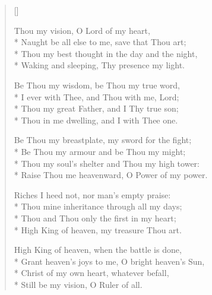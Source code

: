 \newHymn
{}
\begin{verse}[\versewidth]

 Thou my vision, O Lord of my heart,\\*
 Naught be all else to me, save that Thou art;\\*
Thou my best thought in the day and the night,\\*
Waking and sleeping, Thy presence my light.

Be Thou my wisdom, be Thou my true word,\\*
I ever with Thee, and Thou with me, Lord;\\*
Thou my great Father, and I Thy true son;\\*
Thou in me dwelling, and I with Thee one.


Be Thou my breastplate, my sword for the fight;\\*
Be Thou my armour and be Thou my might;\\*
Thou my soul's shelter and Thou my high tower:\\*
Raise Thou me heavenward, O Power of my power.


Riches I heed not, nor man's empty praise:\\*
Thou mine inheritance through all my days;\\*
Thou and Thou only the first in my heart;\\*
High King of heaven, my treasure Thou art.


High King of heaven, when the battle is done,\\*
Grant heaven's joys to me, O bright heaven's Sun,\\*
Christ of my own heart, whatever befall,\\*
Still be my vision, O Ruler of all.

\end{verse}

